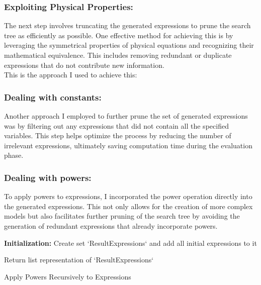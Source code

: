 \documentclass{article}
\begin{document}
\subsubsection{ Exploiting Physical Properties: }

The next step involves truncating the generated expressions to prune the search tree as efficiently as possible. One effective method for achieving this is by leveraging the symmetrical properties of physical equations and recognizing their mathematical equivalence. This includes removing redundant or duplicate expressions that do not contribute new information.\\

This is the approach I used to achieve this:\\


\subsubsection{Dealing with constants:}

Another approach I employed to further prune the set of generated expressions was by filtering out any expressions that did not contain all the specified variables. This step helps optimize the process by reducing the number of irrelevant expressions, ultimately saving computation time during the evaluation phase.\\


\subsubsection{Dealing with powers:}

To apply powers to expressions, I incorporated the power operation directly into the generated expressions. This not only allows for the creation of more complex models but also facilitates further pruning of the search tree by avoiding the generation of redundant expressions that already incorporate powers.\\



\begin{algorithm}[H]
\SetAlgoLined
{}

\textbf{Initialization:}\;
Create set `ResultExpressions` and add all initial expressions to it\;


Return list representation of `ResultExpressions`\;

\caption{Apply Powers Recursively to Expressions}
\label{alg:apply_powers} %
\end{algorithm}
\end{document}
